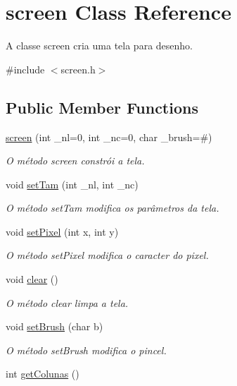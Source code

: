 \hypertarget{classscreen}{}\section{screen Class Reference}
\label{classscreen}


A classe screen cria uma tela para desenho.  




{\ttfamily \#include $<$screen.\+h$>$}

\subsection*{Public Member Functions}
\begin{DoxyCompactItemize}
\item 
\hyperlink{classscreen_ad16be26c6e8e75af862a9106d4ed65a6}{screen} (int \+\_\+nl=0, int \+\_\+nc=0, char \+\_\+brush=\textquotesingle{}\#\textquotesingle{})
\begin{DoxyCompactList}\small\item\em O método screen constrói a tela. \end{DoxyCompactList}\item 
void \hyperlink{classscreen_a42656b68b610befe9da6416b865f1286}{set\+Tam} (int \+\_\+nl, int \+\_\+nc)
\begin{DoxyCompactList}\small\item\em O método set\+Tam modifica os parâmetros da tela. \end{DoxyCompactList}\item 
void \hyperlink{classscreen_aed0ef55e91ba2915c9dfe236193f311d}{set\+Pixel} (int x, int y)\hypertarget{classscreen_aed0ef55e91ba2915c9dfe236193f311d}{}\label{classscreen_aed0ef55e91ba2915c9dfe236193f311d}

\begin{DoxyCompactList}\small\item\em O método set\+Pixel modifica o caracter do pixel. \end{DoxyCompactList}\item 
void \hyperlink{classscreen_a5347be7d08190bf905384196da69fc44}{clear} ()\hypertarget{classscreen_a5347be7d08190bf905384196da69fc44}{}\label{classscreen_a5347be7d08190bf905384196da69fc44}

\begin{DoxyCompactList}\small\item\em O método clear limpa a tela. \end{DoxyCompactList}\item 
void \hyperlink{classscreen_aaa6ee5aa8be3ec4257d383a3a83bb4e8}{set\+Brush} (char b)
\begin{DoxyCompactList}\small\item\em O método set\+Brush modifica o pincel. \end{DoxyCompactList}\item 
int \hyperlink{classscreen_ae327deedb0df15256bef370d6c53f015}{get\+Colunas} ()\hypertarget{classscreen_ae327deedb0df15256bef370d6c53f015}{}\label{classscreen_ae327deedb0df15256bef370d6c53f015}


\end{DoxyCompactItemize}
